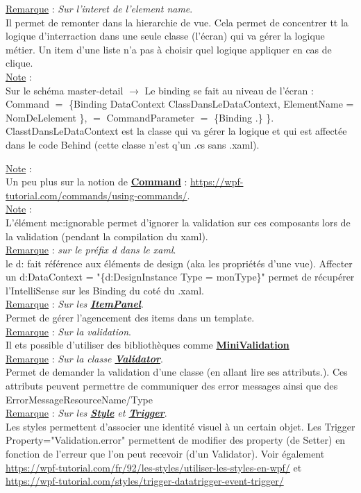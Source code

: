 \documentclass[a4paper,12pt,twoside]{article}
\newcommand{\urlcolor}{magenta}  %
\newcommand{\keycolor}{purple} %
\newcommand{\incode}[1]{{\footnotesize\ttfamily #1}} %
\newcommand{\rem}[2]{\noindent\underline{Remarque} : \textit{#1}.\\ \indent #2}
\newcommand{\note}[1]{\noindent\underline{Note} : \\ \indent #1}
\newcommand{\keyref}[2]{\hypersetup{urlcolor=\keycolor} \href{#1}{\textbf{#2}}\hypersetup{urlcolor=\urlcolor}}
\begin{document}
\rem{Sur l'interet de l'element name}{Il permet de remonter dans la hierarchie de vue. Cela permet de concentrer tt la logique d'interraction dans une seule classe (l'écran) qui va gérer la logique métier. Un item d'une liste n'a pas à choisir quel logique appliquer en cas de clique.}\\

\note{Sur le schéma master-detail $\to$ Le binding se fait au niveau de l'écran : Command $=$ \{Binding DataContext ClassDansLeDataContext, ElementName = NomDeLelement \},  $=$ CommandParameter $=$ \{Binding .\} \}.  ClasstDansLeDataContext est la classe qui va gérer la logique et qui est affectée dans le code Behind (cette classe n'est q'un .cs sans .xaml).}

\note{Un peu plus sur la notion de \keyref{https://docs.microsoft.com/fr-fr/dotnet/desktop/wpf/advanced/commanding-overview?view=netframeworkdesktop-4.8}{Command} : \url{https://wpf-tutorial.com/commands/using-commands/}.}\\

\note{L'élément \incode{mc:ignorable} permet d'ignorer la validation sur ces composants lors de la validation (pendant la compilation du xaml).}\\

\rem{sur le préfix \incode{d} dans le xaml}{le \incode{d:} fait référence aux éléments de design (aka les propriétés d'une vue). Affecter un d:DataContext = "\{d:DesignInstance Type = monType\}" permet de récupérer l'IntelliSense sur les Binding du coté du .xaml.}\\

\rem{Sur les \keyref{https://docs.microsoft.com/fr-fr/dotnet/api/system.windows.controls.itemscontrol.itemspanel?view=windowsdesktop-6.0}{ItemPanel}}{Permet de gérer l'agencement des items dans un template.}\\

\rem{Sur la validation}{Il ets possible d'utiliser des bibliothèques comme \keyref{https://github.com/DamianEdwards/MiniValidation}{MiniValidation}}\\

\rem{Sur la classe \keyref{https://docs.microsoft.com/fr-fr/dotnet/api/system.componentmodel.dataannotations.validator?view=net-6.0}{Validator}}{Permet de demander la validation d'une classe (en allant lire ses attributs.). Ces attributs peuvent permettre de communiquer des error messages ainsi que des ErrorMessageResourceName/Type}\\

\rem{Sur les \keyref{https://docs.microsoft.com/fr-fr/dotnet/desktop/wpf/controls/styles-templates-overview?view=netdesktop-6.0}{Style} et \keyref{https://docs.microsoft.com/fr-fr/dotnet/api/system.windows.style.triggers?view=windowsdesktop-6.0}{Trigger}}{Les styles permettent d'associer une identité visuel à un certain objet. Les Trigger Property="Validation.error" permettent de modifier des property (de Setter) en fonction de l'erreur que l'on peut recevoir (d'un Validator). Voir également \url{https://wpf-tutorial.com/fr/92/les-styles/utiliser-les-styles-en-wpf/} et \url{https://wpf-tutorial.com/styles/trigger-datatrigger-event-trigger/}}\\
\end{document}

